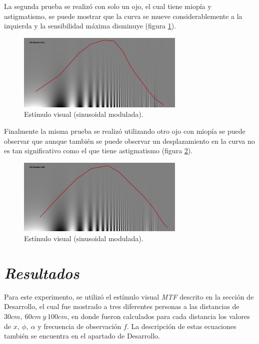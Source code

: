 \documentclass[conference]{IEEEtran}
\begin{document}
La segunda prueba se realizó con solo un ojo, el cual
tiene miopía y astigmatismo, se puede mostrar que la curva se mueve
considerablemente a la izquierda y la sensibilidad máxima disminuye (figura \ref{astigmatismo}).

\begin{figure}[htbp]
\centerline{\includegraphics[width=80mm]{code/astigmatismo}}
\caption{Estímulo visual (sinusoidal modulada).}
\label{astigmatismo}
\end{figure}

Finalmente la misma prueba se realizó utilizando otro ojo con
miopía se puede observar que aunque también se puede observar un desplazamiento
en la curva no es tan significativo como el que tiene astigmatismo (figura \ref{miopia}).


\begin{figure}[htbp]
\centerline{\includegraphics[width=80mm]{code/miopia}}
\caption{Estímulo visual (sinusoidal modulada).}
\label{miopia}
\end{figure}

\section{\textit{Resultados}}

Para este experimento, se utilizó el estímulo visual \textit{MTF} descrito en la sección de Desarrollo, el cual fue mostrado a tres diferentes personas a las distancias de $30cm,\ 60cm\ y\ 100cm$, en donde fueron calculados para cada distancia los valores de $x,\ \phi,\ \alpha$ y frecuencia de observación $f$. La descripción de estas ecuaciones también se encuentra en el apartado de Desarrollo.
\end{document}
